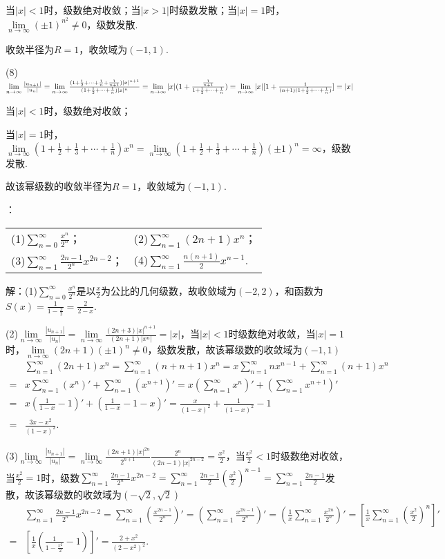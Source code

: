 \documentclass[12pt,UTF8]{ctexart}
\newcommand\Lim[0]{\lim\limits_{n\rightarrow\infty}}
\newcommand\Ser[1]{\sum_{n=#1}^\infty}
\begin{document}
\begin{enumerate}
当$|x|<1$时，级数绝对收敛；当$|x>1|$时级数发散；当$|x|=1$时，$\Lim(\pm1)^{n^2}\neq0$，级数发散.

收敛半径为$R=1$，收敛域为$(-1,1)$.

(8)$\Lim\frac{|u_{n+1}|}{|u_n|}=\Lim\frac{(1+\frac12+\cdots+\frac1n+\frac1{n+1})|x|^{n+1}}{(1+\frac12+\cdots+\frac1n)|x|^n}=\Lim|x|(1+\frac{\frac1{n+1}}{1+\frac12+\cdots+\frac1n})=\Lim|x|[1+\frac1{(n+1)(1+\frac12+\cdots+\frac1n)}]\\
=|x|$

当$|x|<1$时，级数绝对收敛；

当$|x|=1$时，$\Lim(1+\frac12+\frac13+\cdots+\frac1n)x^n=\Lim(1+\frac12+\frac13+\cdots+\frac1n)(\pm1)^n=\infty$，级数发散.

故该幂级数的收敛半径为$R=1$，收敛域为$(-1,1)$.

：
\newline
\begin{tabular}{ll}
(1)$\Ser{0}\frac{x^n}{2^n}$；&(2)$\Ser{1}(2n+1)x^n$；\\
(3)$\Ser{1}\frac{2n-1}{2^n}x^{2n-2}$；&(4)$\Ser{1}\frac{n(n+1)}2x^{n-1}$.
\end{tabular}

解：(1)$\Ser{0}\frac{x^n}{2^n}$是以$\frac x2$为公比的几何级数，故收敛域为$(-2,2)$，和函数为$S(x)=\frac1{1-\frac x2}=\frac2{2-x}$.

(2)$\Lim\frac{|u_{n+1}|}{|u_n|}=\Lim\frac{(2n+3)|x|^{n+1}}{(2n+1)|x^n|}=|x|$，当$|x|<1$时级数绝对收敛，当$|x|=1$时，$\Lim(2n+1)(\pm1)^n\neq0$，级数发散，故该幂级数的收敛域为$(-1,1)$
\[\begin{split}
&\Ser{1}(2n+1)x^n=\Ser{1}(n+n+1)x^n=x\Ser{1}nx^{n-1}+\Ser{1}(n+1)x^n\\
=&x\Ser{1}(x^n)'+\Ser{1}(x^{n+1})'=x(\Ser{1}x^n)'+(\Ser{1}x^{n+1})'\\
=&x(\frac1{1-x}-1)'+(\frac1{1-x}-1-x)'=\frac x{(1-x)^2}+\frac1{(1-x)^2}-1\\
=&\frac{3x-x^2}{(1-x)^2}.
\end{split}\]

(3)$\Lim\frac{|u_{n+1}|}{|u_n|}=\Lim\frac{(2n+1)|x|^{2n}}{2^{n+1}}\frac{2^n}{(2n-1)|x|^{2n-2}}=\frac{x^2}2$，当$\frac{x^2}2<1$时级数绝对收敛，当$\frac{x^2}2=1$时，级数$\Ser{1}\frac{2n-1}{2^n}x^{2n-2}=\Ser{1}\frac{2n-1}2(\frac{x^2}2)^{n-1}=\Ser{1}\frac{2n-1}2$发散，故该幂级数的收敛域为$(-\sqrt2,\sqrt2)$
\[\begin{split}
&\Ser{1}\frac{2n-1}{2^n}x^{2n-2}=\Ser{1}(\frac{x^{2n-1}}{2^n})'=(\Ser{1}\frac{x^{2n-1}}{2^n})'=(\frac1x\Ser{1}\frac{x^{2n}}{2^n})'=[\frac1x\Ser{1}(\frac{x^2}2)^n]'\\
=&[\frac1x(\frac1{1-\frac{x^2}2}-1)]'=\frac{2+x^2}{(2-x^2)^2}.
\end{split}\]


\end{enumerate}
\end{document}
